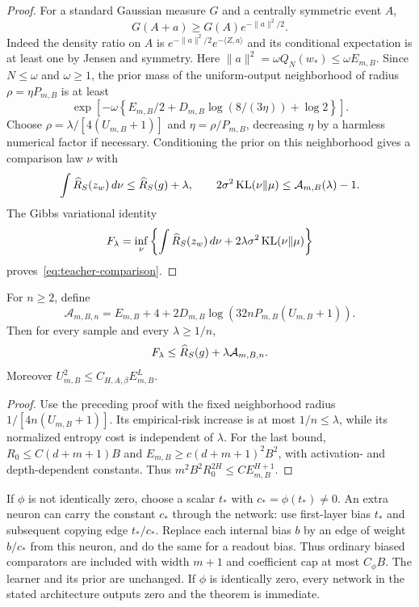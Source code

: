 \begin{proof}
For a standard Gaussian measure $G$ and a centrally symmetric event $A$,
\[
 G(A+a)\ge G(A)e^{-\|a\|^2/2}.
\]
Indeed the density ratio on $A$ is
$e^{-\|a\|^2/2}e^{-\langle Z,a\rangle}$ and its conditional expectation is at least one by Jensen and symmetry. Here
$\|a\|^2=\omega Q_N(w_*)\le\omega E_{m,B}$.
Since $N\le\omega$ and $\omega\ge1$, the prior mass of the uniform-output neighborhood of radius $\rho=\eta P_{m,B}$ is at least
\[
 \exp\!\left[-\omega\left\{
   E_{m,B}/2+D_{m,B}\log(8/(3\eta))+\log2\right\}\right].
\]
Choose $\rho=\lambda/[4(U_{m,B}+1)]$ and $\eta=\rho/P_{m,B}$, decreasing $\eta$ by a harmless numerical factor if necessary. Conditioning the prior on this neighborhood gives a comparison law $\nu$ with
\[
 \int\widehat R_S(z_w)\,d\nu\le\widehat R_S(g)+\lambda,\qquad
 2\sigma^2\operatorname{KL}(\nu\Vert\mu)\le\mathcal A_{m,B}(\lambda)-1.
\]
The Gibbs variational identity
\[
 F_\lambda=\inf_\nu\left\{\int\widehat R_S(z_w)\,d\nu+
                                  2\lambda\sigma^2\operatorname{KL}(\nu\Vert\mu)\right\}
\]
proves~\eqref{eq:teacher-comparison}.
\end{proof}

\begin{corollary}
\label{cor:fixedteacher}
For $n\ge2$, define
\begin{equation}
 \mathcal A_{m,B,n}
 =E_{m,B}+4+
  2D_{m,B}\log\!\left(32nP_{m,B}(U_{m,B}+1)\right).
 \label{eq:fixed-resource}
\end{equation}
Then for every sample and every $\lambda\ge1/n$,
\[
 F_\lambda\le\widehat R_S(g)+\lambda\mathcal A_{m,B,n}.
\]
Moreover $U_{m,B}^2\le C_{H,A,\beta}E_{m,B}^{L}$.
\end{corollary}
\begin{proof}
Use the preceding proof with the fixed neighborhood radius
$1/[4n(U_{m,B}+1)]$. Its empirical-risk increase is at most $1/n\le\lambda$, while its normalized entropy cost is independent of $\lambda$. For the last bound,
$R_0\le C(d+m+1)B$ and
$E_{m,B}\ge c(d+m+1)^2B^2$, with activation- and depth-dependent constants. Thus
$m^2B^2R_0^{2H}\le C E_{m,B}^{H+1}$.
\end{proof}

\begin{remark}
If $\phi$ is not identically zero, choose a scalar $t_*$ with
$c_*=\phi(t_*)\ne0$. An extra neuron can carry the constant $c_*$ through the network: use first-layer bias $t_*$ and subsequent copying edge $t_*/c_*$. Replace each internal bias $b$ by an edge of weight $b/c_*$ from this neuron, and do the same for a readout bias. Thus ordinary biased comparators are included with width $m+1$ and coefficient cap at most $C_\phi B$. The learner and its prior are unchanged. If $\phi$ is identically zero, every network in the stated architecture outputs zero and the theorem is immediate.
\end{remark}
